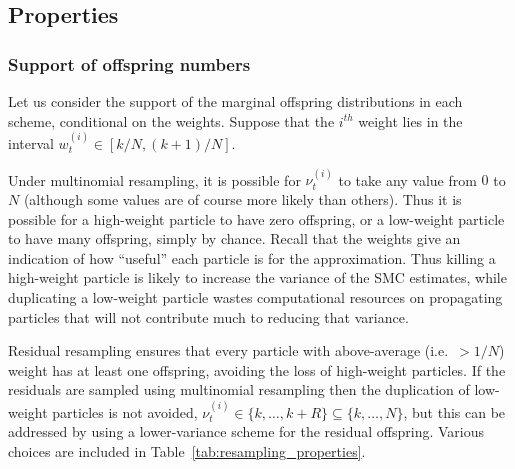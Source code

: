



\subsection{Properties \seb{$\sim$} }\label{sec:resampling_properties}



\subsubsection{Support of offspring numbers \seb{$\checkmark$} }
Let us consider the support of the marginal offspring distributions in each scheme, conditional on the weights. Suppose that the $i^{th}$ weight lies in the interval $w_t^{(i)} \in [k/N, (k+1)/N]$.

Under multinomial resampling, it is possible for $\nu_t^{(i)}$ to take any value from $0$ to $N$ (although some values are of course more likely than others).
Thus it is possible for a high-weight particle to have zero offspring, or a low-weight particle to have many offspring, simply by chance.
Recall that the weights give an indication of how ``useful'' each particle is for the approximation. Thus killing a high-weight particle is likely to increase the variance of the SMC estimates, while duplicating a low-weight particle wastes computational resources on propagating particles that will not contribute much to reducing that variance.

Residual resampling ensures that every particle with above-average (i.e.\ $>1/N$) weight has at least one offspring, avoiding the loss of high-weight particles. If the residuals are sampled using multinomial resampling then the duplication of low-weight particles is not avoided, $\nu_t^{(i)} \in \{k, \dots, k+R\} \subseteq \{k,\dots, N\}$, but this can be addressed by using a lower-variance scheme for the residual offspring. Various choices are included in Table~\ref{tab:resampling_properties}.

